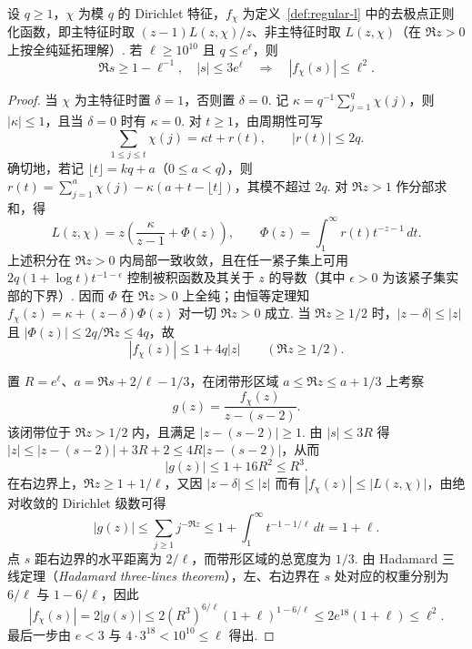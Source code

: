 \begin{lemma}
\label{lem:regular-l-growth}
\emitthmsource
设 $q\ge1$，$\chi$ 为模 $q$ 的 Dirichlet 特征，$f_\chi$ 为定义~\ref{def:regular-l} 中的去极点正则化函数，即主特征时取 $(z-1)L(z,\chi)/z$、非主特征时取 $L(z,\chi)$（在 $\Re z>0$ 上按全纯延拓理解）. 若 $\ell\ge10^{10}$ 且 $q\le e^\ell$，则
\[
 \Re s\ge 1-\ell^{-1},\quad |s|\le3e^\ell
 \quad\Longrightarrow\quad |f_\chi(s)|\le\ell^2.
\]
\end{lemma}

\begin{proof}
当 $\chi$ 为主特征时置 $\delta=1$，否则置 $\delta=0$. 记 $\kappa=q^{-1}\sum_{j=1}^q\chi(j)$，则 $|\kappa|\le1$，且当 $\delta=0$ 时有 $\kappa=0$. 对 $t\ge1$，由周期性可写
\[
 \sum_{1\le j\le t}\chi(j)=\kappa t+r(t),\qquad |r(t)|\le2q .
\]
确切地，若记 $\lfloor t\rfloor=kq+a$（$0\le a<q$），则
$r(t)=\sum_{j=1}^a\chi(j)-\kappa(a+t-\lfloor t\rfloor)$，其模不超过 $2q$.
对 $\Re z>1$ 作分部求和，得
\[
 L(z,\chi)
 =z\left(\frac{\kappa}{z-1}+\Phi(z)\right),
 \qquad
 \Phi(z)=\int_1^\infty r(t)t^{-z-1}\,dt .
\]
上述积分在 $\Re z>0$ 内局部一致收敛，且在任一紧子集上可用
$2q(1+\log t)t^{-1-\epsilon}$ 控制被积函数及其关于 $z$ 的导数（其中 $\epsilon>0$ 为该紧子集实部的下界）.
因而 $\Phi$ 在 $\Re z>0$ 上全纯；由恒等定理知 $f_\chi(z)=\kappa+(z-\delta)\Phi(z)$ 对一切 $\Re z>0$ 成立. 当 $\Re z\ge1/2$ 时，$|z-\delta|\le|z|$ 且
$|\Phi(z)|\le2q/\Re z\le4q$，故
\[
 |f_\chi(z)|\le 1+4q|z| \qquad (\Re z\ge1/2).
\]

置 $R=e^\ell$、$a=\Re s+2/\ell-1/3$，在闭带形区域 $a\le\Re z\le a+1/3$ 上考察
\[
 g(z)=\frac{f_\chi(z)}{z-(s-2)}.
\]
该闭带位于 $\Re z>1/2$ 内，且满足 $|z-(s-2)|\ge1$. 由 $|s|\le3R$ 得
$|z|\le |z-(s-2)|+3R+2\le 4R|z-(s-2)|$，从而
\[
 |g(z)|\le1+16R^2\le R^3.
\]
在右边界上，$\Re z\ge1+1/\ell$，又因 $|z-\delta|\le|z|$ 而有 $|f_\chi(z)|\le |L(z,\chi)|$，由绝对收敛的 Dirichlet 级数可得
\[
 |g(z)|\le\sum_{j\ge1} j^{-\Re z}
   \le 1+\int_1^\infty t^{-1-1/\ell}\,dt=1+\ell .
\]
点 $s$ 距右边界的水平距离为 $2/\ell$，而带形区域的总宽度为 $1/3$. 由 Hadamard 三线定理（\emph{Hadamard three-lines theorem}），左、右边界在 $s$ 处对应的权重分别为 $6/\ell$ 与 $1-6/\ell$，因此
\[
 |f_\chi(s)|=2|g(s)|
 \le 2(R^3)^{6/\ell}(1+\ell)^{1-6/\ell}
 \le 2e^{18}(1+\ell)\le\ell^2.
\]
最后一步由 $e<3$ 与 $4\cdot3^{18}<10^{10}\le\ell$ 得出.
\end{proof}

